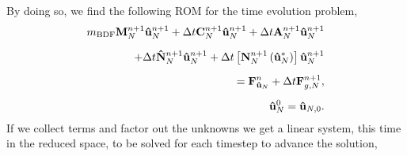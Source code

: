 \documentclass[../../thesis.tex]{subfiles}
\newcommand{\dt}{\ensuremath{\Delta t}}
\begin{document}
By doing so, we find the following ROM for the time evolution problem,
\begin{subequations}
    \label{eq:1d_rom_weak_formulation_discrete}
    \begin{align}
        m_{\text{BDF}} \vb{M}^{n+1}_{N} \vb{\hat{u}}_{N}^{n+1}
        + \dt \vb{C}^{n+1}_{N} \vb{\hat{u}}_{N}^{n+1}
        + \dt \vb{A}^{n+1}_{N} \vb{\hat{u}}_{N}^{n+1}
        \nonumber 
        \\[2mm]
        + \dt \vb{\hat{N}}^{n+1}_{N} \vb{\hat{u}}_{N}^{n+1}
        + \dt \left[\vb{N}^{n+1}_{N}\left(\vb{\hat{u}}_{N}^{*}\right)\right] \vb{\hat{u}}_{N}^{n+1}
        \nonumber
        \\[2mm]
        = \vb{F}_{\vb{\hat{u}}_{N}}^{n}
        + \dt \vb{F}_{g,N}^{n+1},
        \\[2mm]
        \vb{\hat{u}}_N^{0} = \vb{\hat{u}}_{N,0}.
    \end{align}
\end{subequations}
If we collect terms and factor out the unknowns we get a linear system, 
this time in the reduced space, to be solved for each timestep to advance the solution,
\end{document}
